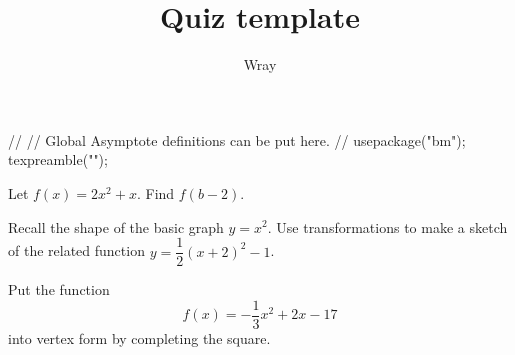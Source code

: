 \documentclass[addpoints, 12pt]{exam}
\title{Quiz template}
\author{Wray}
\begin{document}
\begin{asydef}
//
// Global Asymptote definitions can be put here.
//
usepackage("bm");
texpreamble("\def\V#1{\bm{#1}}");
\end{asydef}



\bigskip

             
\bigskip
\bigskip

\smallskip

\begin{questions}

\question[5]
Let $f(x) = 2x^2 + x$.  Find $f(b-2)$.


\question[5]

Recall the shape of the basic graph $y = x^2$.  Use transformations to make a sketch of the related function $y = \dfrac{1}{2} (x+2)^2 - 1$.  


\newpage

\question[10]

Put the function
\begin{equation*}
	f(x) = -\dfrac{1}{3} x^2 + 2x - 17
\end{equation*}
into vertex form by completing the square.

\end{questions}
\end{document}
